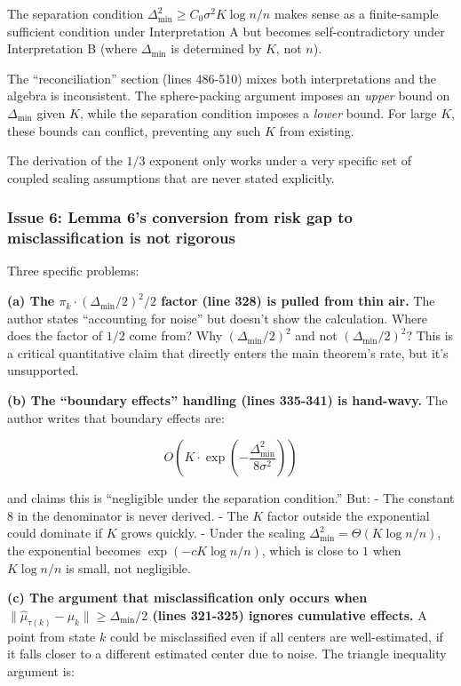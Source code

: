 \documentclass[
  12pt,
]{ctexart}
\begin{document}
The separation condition
\(\Delta_{\min}^2 \geq C_0 \sigma^2 K \log n / n\) makes sense as a
finite-sample sufficient condition under Interpretation A but becomes
self-contradictory under Interpretation B (where \(\Delta_{\min}\) is
determined by \(K\), not \(n\)).

The ``reconciliation'' section (lines 486-510) mixes both
interpretations and the algebra is inconsistent. The sphere-packing
argument imposes an \emph{upper} bound on \(\Delta_{\min}\) given \(K\),
while the separation condition imposes a \emph{lower} bound. For large
\(K\), these bounds can conflict, preventing any such \(K\) from
existing.

The derivation of the \(1/3\) exponent only works under a very specific
set of coupled scaling assumptions that are never stated explicitly.

\subsubsection{Issue 6: Lemma 6's conversion from risk gap to
misclassification is not
rigorous}\label{issue-6-lemma-6s-conversion-from-risk-gap-to-misclassification-is-not-rigorous}

Three specific problems:

\textbf{(a) The \(\pi_k \cdot (\Delta_{\min}/2)^2 / 2\) factor (line
328) is pulled from thin air.} The author states ``accounting for
noise'' but doesn't show the calculation. Where does the factor of
\(1/2\) come from? Why \((\Delta_{\min}/2)^2\) and not
\((\Delta_{\min}/2)^2\)? This is a critical quantitative claim that
directly enters the main theorem's rate, but it's unsupported.

\textbf{(b) The ``boundary effects'' handling (lines 335-341) is
hand-wavy.} The author writes that boundary effects are:

\[O\left(K \cdot \exp\left(-\frac{\Delta_{\min}^2}{8\sigma^2}\right)\right)\]

and claims this is ``negligible under the separation condition.'' But: -
The constant \(8\) in the denominator is never derived. - The \(K\)
factor outside the exponential could dominate if \(K\) grows quickly. -
Under the scaling \(\Delta_{\min}^2 = \Theta(K \log n / n)\), the
exponential becomes \(\exp(-c K \log n / n)\), which is close to \(1\)
when \(K \log n / n\) is small, not negligible.

\textbf{(c) The argument that misclassification only occurs when
\(\|\hat{\mu}_{\tau(k)} - \mu_k\| \geq \Delta_{\min}/2\) (lines 321-325)
ignores cumulative effects.} A point from state \(k\) could be
misclassified even if all centers are well-estimated, if it falls closer
to a different estimated center due to noise. The triangle inequality
argument is:
\end{document}
